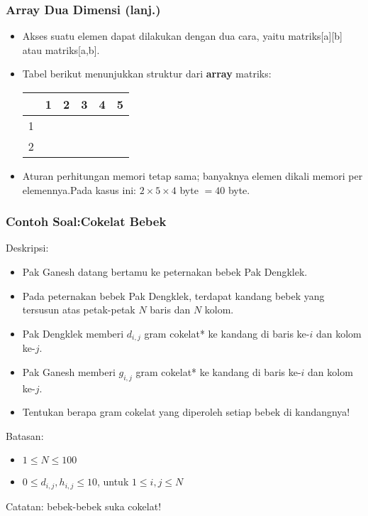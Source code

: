 \begin{frame}
\frametitle{Array Dua Dimensi (lanj.)}
\begin{itemize}
  \item Akses suatu elemen dapat dilakukan dengan dua cara, yaitu matriks[a][b] atau matriks[a,b].
  \item Tabel berikut menunjukkan struktur dari \textbf{array} matriks:
  \begin{table}[h]
    \begin{tabular}{c|c|c|c|c|c|}
        & 1 & 2 & 3 & 4 & 5\\
      \hline 1 & & & & & \\
      \hline 2 & & & & & \\
      \hline
    \end{tabular}
  \end{table}
  \item Aturan perhitungan memori tetap sama; banyaknya elemen dikali memori per elemennya.\newline Pada kasus ini: $2 \times 5 \times 4$ byte $= 40$ byte.
\end{itemize}
\end{frame}

\begin{frame}
\frametitle{Contoh Soal:\newline Cokelat Bebek}
Deskripsi:
\begin{itemize}
  \item Pak Ganesh datang bertamu ke peternakan bebek Pak Dengklek.
  \item Pada peternakan bebek Pak Dengklek, terdapat kandang bebek yang tersusun atas petak-petak $N$ baris dan $N$ kolom.
  \item Pak Dengklek memberi $d_{i,j}$ gram cokelat* ke kandang di baris ke-$i$ dan kolom ke-$j$.
  \item Pak Ganesh memberi $g_{i,j}$ gram cokelat* ke kandang di baris ke-$i$ dan kolom ke-$j$.
  \item Tentukan berapa gram cokelat yang diperoleh setiap bebek di kandangnya!
\end{itemize}
Batasan:
\begin{itemize}
  \item $1 \le N \le 100$
  \item $0 \le d_{i,j}, h_{i,j} \le 10$, untuk $1 \le i,j \le N$
\end{itemize}

\tiny *Catatan: bebek-bebek suka cokelat!
\end{frame}

